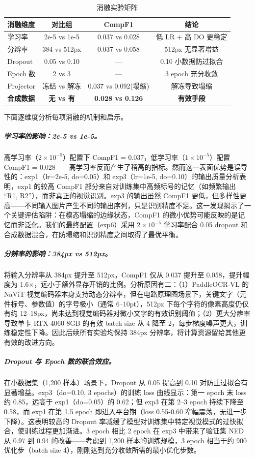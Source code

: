 \begin{table}[h]
\centering
\caption{消融实验矩阵}
\begin{tabular}{lccc}
\toprule
\textbf{消融维度} & \textbf{对比组} & \textbf{CompF1} & \textbf{结论} \\
\midrule
学习率       & 2e-5 vs 1e-5 & 0.037 vs 0.028 & 低 LR + 高 DO 更稳定 \\
分辨率       & 384 vs 512px & 0.037 vs 0.058 & 512px 无显著增益 \\
Dropout      & 0.05 vs 0.10 & — & 0.10 小数据防过拟合 \\
Epoch 数     & 2 vs 3       & — & 3 epoch 充分收敛 \\
Projector    & 冻结 vs 解冻 & 0.037 vs 0.092(塌缩) & 解冻导致塌缩 \\
\textbf{合成数据} & \textbf{无 vs 有} & \textbf{0.028 vs 0.126} & \textbf{有效手段} \\
\bottomrule
\end{tabular}
\end{table}

下面逐维度分析每项消融的机制和启示。

\subparagraph{学习率的影响：2e-5 vs 1e-5。}
高学习率（$2\times10^{-5}$）配置下 CompF1 = 0.037，低学习率（$1\times10^{-5}$）配置 CompF1 = 0.028——高学习率反而产生了稍高的指标。然而这一表面优势是误导性的：exp1（lr=2e-5, do=0.05）和 exp3（lr=1e-5, do=0.10）的输出质量分析表明，exp1 的较高 CompF1 部分来自对训练集中高频标号的记忆（如频繁输出 ``R1, R2''），而非真正的视觉识别。exp3 的输出虽然 CompF1 更低，但多样性更高——不同输入图片产生不同的输出序列，只是识别精度不足。这一发现揭示了一个关键评估陷阱：在模态塌缩的边缘状态，CompF1 的微小优势可能反映的是记忆而非泛化。我们的最终配置（exp6）采用 $2\times10^{-5}$ 学习率配合 0.05 dropout 和合成数据混合，在防塌缩和识别精度之间取得了最优平衡。

\subparagraph{分辨率的影响：384px vs 512px。}
将输入分辨率从 384px 提升至 512px，CompF1 仅从 0.037 提升至 0.058，提升幅度为 1.6$\times$，远小于额外显存开销的比例。分析原因有二：（1）PaddleOCR-VL 的 NaViT 视觉编码器本身支持动态分辨率，但在电路原理图场景下，关键文字（元件标号、参数值）的字号极小（通常 6--10pt），512px 下每个字符的像素高度仍仅有约 12--18px，尚未达到视觉编码器对微小文字的有效识别阈值；（2）更大分辨率导致单卡 RTX 4060 8GB 的有效 batch size 从 4 降至 2，每步梯度噪声更大，训练稳定性下降。因此后续所有实验均保持 384px 分辨率，将计算资源留给其他更有效的改进方向。

\subparagraph{Dropout 与 Epoch 数的联合效应。}
在小数据集（1,200 样本）场景下，Dropout 从 0.05 提高到 0.10 对防止过拟合有显著增益。exp3（do=0.10, 3 epochs）的训练 loss 曲线显示：第一 epoch 末 loss 约 0.85，远高于 exp1（do=0.05）的 0.62；但 exp3 在第 2--3 epoch 持续下降至 0.58，而 exp1 在第 1.5 epoch 即进入平台期（loss 0.55-0.60 窄幅震荡，无进一步下降）。这表明较高的 Dropout 率减缓了模型对训练集中特定视觉模式的过快拟合，使训练过程更加渐进。3 epoch 相比 2 epoch 在 exp3 中带来了验证集 NED 从 0.97 到 0.94 的改善——考虑到 1,200 样本的训练规模，3 epoch 相当于约 900 优化步（batch size 4），刚刚达到充分收敛所需的最小优化步数。


